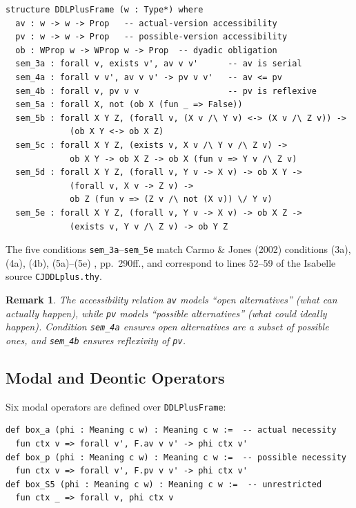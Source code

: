 \documentclass[]{article}
\newtheorem{remark}[theorem]{Remark}
\newcommand{\code}[1]{\texttt{#1}}
\begin{document}
\begin{lstlisting}
structure DDLPlusFrame (w : Type*) where
  av : w -> w -> Prop   -- actual-version accessibility
  pv : w -> w -> Prop   -- possible-version accessibility
  ob : WProp w -> WProp w -> Prop  -- dyadic obligation
  sem_3a : forall v, exists v', av v v'      -- av is serial
  sem_4a : forall v v', av v v' -> pv v v'   -- av <= pv
  sem_4b : forall v, pv v v                  -- pv is reflexive
  sem_5a : forall X, not (ob X (fun _ => False))
  sem_5b : forall X Y Z, (forall v, (X v /\ Y v) <-> (X v /\ Z v)) ->
             (ob X Y <-> ob X Z)
  sem_5c : forall X Y Z, (exists v, X v /\ Y v /\ Z v) ->
             ob X Y -> ob X Z -> ob X (fun v => Y v /\ Z v)
  sem_5d : forall X Y Z, (forall v, Y v -> X v) -> ob X Y ->
             (forall v, X v -> Z v) ->
             ob Z (fun v => (Z v /\ not (X v)) \/ Y v)
  sem_5e : forall X Y Z, (forall v, Y v -> X v) -> ob X Z ->
             (exists v, Y v /\ Z v) -> ob Y Z
\end{lstlisting}

\noindent
The five conditions \code{sem\_3a}--\code{sem\_5e} match Carmo \& Jones (2002)
conditions (3a), (4a), (4b), (5a)--(5e) \cite{CarmoJones2002}, pp.~290ff., and
correspond to lines 52--59 of the Isabelle source \code{CJDDLplus.thy}.

\begin{remark}
The accessibility relation \code{av} models ``open alternatives'' (what can
actually happen), while \code{pv} models ``possible alternatives'' (what could
ideally happen).  Condition \code{sem\_4a} ensures open alternatives are a
subset of possible ones, and \code{sem\_4b} ensures reflexivity of \code{pv}.
\end{remark}

\subsection{Modal and Deontic Operators}

Six modal operators are defined over \code{DDLPlusFrame}:

\begin{lstlisting}
def box_a (phi : Meaning c w) : Meaning c w :=  -- actual necessity
  fun ctx v => forall v', F.av v v' -> phi ctx v'
def box_p (phi : Meaning c w) : Meaning c w :=  -- possible necessity
  fun ctx v => forall v', F.pv v v' -> phi ctx v'
def box_S5 (phi : Meaning c w) : Meaning c w :=  -- unrestricted
  fun ctx _ => forall v, phi ctx v
\end{lstlisting}
\end{document}
